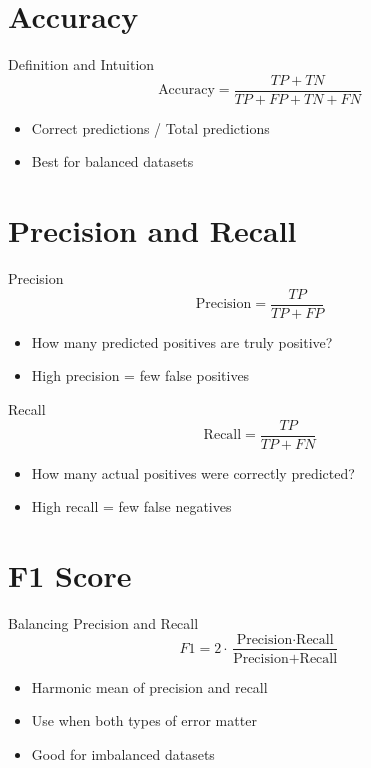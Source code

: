 \documentclass[aspectratio=169]{beamer}
\begin{document}
\section{Accuracy}
\label{sec:org9b1f2af}
\begin{frame}[label={sec:orgc3336b3}]{Definition and Intuition}
\[
\text{Accuracy} = \frac{TP + TN}{TP + FP + TN + FN}
\]
\begin{itemize}
\item Correct predictions / Total predictions
\item Best for balanced datasets
\end{itemize}
\end{frame}

\section{Precision and Recall}
\label{sec:org96df35a}
\begin{frame}[label={sec:org2a45f28}]{Precision}
\[
\text{Precision} = \frac{TP}{TP + FP}
\]
\begin{itemize}
\item How many predicted positives are truly positive?
\item High precision = few false positives
\end{itemize}
\end{frame}

\begin{frame}[label={sec:org2d6b18c}]{Recall}
\[
\text{Recall} = \frac{TP}{TP + FN}
\]
\begin{itemize}
\item How many actual positives were correctly predicted?
\item High recall = few false negatives
\end{itemize}
\end{frame}

\section{F1 Score}
\label{sec:org29564bc}
\begin{frame}[label={sec:orgfaf8b4d}]{Balancing Precision and Recall}
\[
F1 = 2 \cdot \frac{\text{Precision} \cdot \text{Recall}}{\text{Precision} + \text{Recall}}
\]
\begin{itemize}
\item Harmonic mean of precision and recall
\item Use when both types of error matter
\item Good for imbalanced datasets
\end{itemize}
\end{frame}
\end{document}
